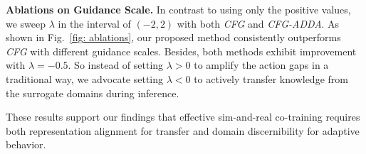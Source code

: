 \textbf{Ablations on Guidance Scale.}
In contrast to using only the positive values, we sweep $\lambda$ in the interval of $(-2,2)$ with both \textit{CFG} and \textit{CFG-ADDA}. 
As shown in Fig.~\ref{fig: ablations}, our proposed method consistently outperforms \textit{CFG} with different guidance scales.
Besides, both methods exhibit improvement with $\lambda=-0.5$.
So instead of setting $\lambda>0$ to amplify the action gaps in a traditional way, we advocate setting $\lambda<0$ to actively transfer knowledge from the surrogate domains during inference.




These results support our findings that effective sim-and-real co-training requires both representation alignment for transfer and domain discernibility for adaptive behavior.







